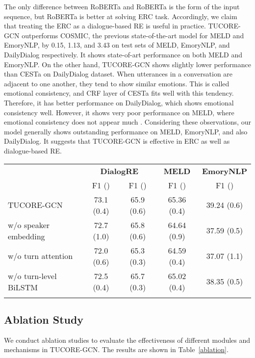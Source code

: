 \documentclass[11pt]{article}
\begin{document}
The only difference between RoBERTa and RoBERTa is the form of the input sequence, but RoBERTa is better at solving ERC task. Accordingly, we claim that treating the ERC as a dialogue-based RE is useful in practice. 
TUCORE-GCN outperforms COSMIC, the previous state-of-the-art model for MELD and EmoryNLP, by 0.15, 1.13, and 3.43 on test sets of MELD, EmoryNLP, and DailyDialog respectively. It shows state-of-art performance on both MELD and EmoryNLP.
On the other hand, TUCORE-GCN shows slightly lower performance than CESTa on DailyDialog dataset. When utterances in a conversation are adjacent to one another, they tend to show similar emotions. This is called emotional consistency, and CRF layer of CESTa fits well with this tendency. Therefore, it has better performance on DailyDialog, which shows emotional consistency well. However, it shows very poor performance on MELD, where emotional consistency does not appear much \citep{wang-etal-2020-contextualized}.
Considering these observations, our model generally shows outstanding performance on MELD, EmoryNLP, and also DailyDialog. It suggests that TUCORE-GCN is effective in ERC as well as dialogue-based RE.



\begin{table*}
\centering
{\small
\begin{tabular}{l|cc|c|c}
\Xhline{3\arrayrulewidth}
\multirow{2}{*}{\textbf{Method}} & \multicolumn{2}{c|}{\textbf{DialogRE}} & \textbf{MELD} &\textbf{EmoryNLP} \\
& F1 () & F1 () & F1 () & F1 () \\
\hline
TUCORE-GCN & 73.1 (0.4) & 65.9 (0.6) & 65.36 (0.4) & 39.24 (0.6) \\
w/o speaker embedding & 72.7 (1.0) & 65.8 (0.6) & 64.64 (0.9) & 37.59 (0.5) \\
w/o turn attention & 72.0 (0.6) & 65.3 (0.3) & 64.59 (0.4) & 37.07 (1.1) \\
w/o turn-level BiLSTM & 72.5 (0.4) & 65.7 (0.3) & 65.02 (0.4) & 38.35 (0.5) \\
\Xhline{3\arrayrulewidth}
\end{tabular}
}
\caption{\label{ablation} Results of ablation study on DialogRE, MELD, and EmoryNLP.}
\end{table*}

\subsection{Ablation Study}
\label{ssec:ablation study}
We conduct ablation studies to evaluate the effectiveness of different modules and mechanisms in TUCORE-GCN. The results are shown in Table~\ref{ablation}.
\end{document}
